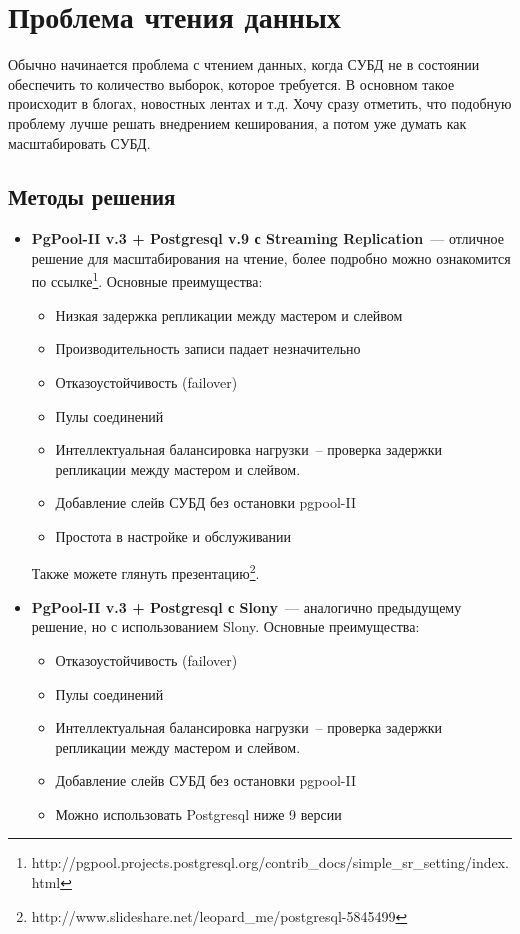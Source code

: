 \section{Проблема чтения данных}

Обычно начинается проблема с чтением данных, когда СУБД не в состоянии обеспечить то количество выборок, которое требуется. 
В основном такое происходит в блогах, новостных лентах и т.д. Хочу сразу отметить, что подобную проблему лучше решать 
внедрением кеширования, а потом уже думать как масштабировать СУБД.

\subsection{Методы решения}

\begin{itemize}
\item \textbf{PgPool-II v.3 + Postgresql v.9 с Streaming Replication}~--- отличное решение для масштабирования на чтение, 
более подробно можно ознакомится по ссылке\footnote{http://pgpool.projects.postgresql.org/contrib\_docs/simple\_sr\_setting/index.html}. 
Основные преимущества:
\begin{itemize}
\item Низкая задержка репликации между мастером и слейвом
\item Производительность записи падает незначительно
\item Отказоустойчивость (failover)
\item Пулы соединений
\item Интеллектуальная балансировка нагрузки~-- проверка задержки репликации между мастером и слейвом.
\item Добавление слейв СУБД без остановки pgpool-II
\item Простота в настройке и обслуживании
\end{itemize}
Также можете глянуть презентацию\footnote{http://www.slideshare.net/leopard\_me/postgresql-5845499}.

\item \textbf{PgPool-II v.3 + Postgresql с Slony}~--- аналогично предыдущему решение, но с использованием Slony.
Основные преимущества:
\begin{itemize}
\item Отказоустойчивость (failover)
\item Пулы соединений
\item Интеллектуальная балансировка нагрузки~-- проверка задержки репликации между мастером и слейвом.
\item Добавление слейв СУБД без остановки pgpool-II
\item Можно использовать Postgresql ниже 9 версии
\end{itemize}
\end{itemize}

